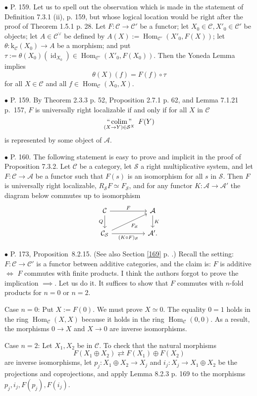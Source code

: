 \documentclass[12pt]{article}
\theoremstyle{remark}
\newcommand{\bu}{\bullet}
\newcommand{\n}{\noindent}
\newcommand{\A}{\mathcal A}
\newcommand{\C}{\mathcal C}
\newcommand{\SSS}{\mathcal S}
\newcommand{\be}{\begin{equation}}
\newcommand{\ee}{\end{equation}}
\newcommand{\pr}{Proposition}
\DeclareMathOperator*{\coli}{colim}
\DeclareMathOperator*{\icolim}{``\coli"}
\DeclareMathOperator{\id}{id}
\DeclareMathOperator{\Hom}{Hom}
\begin{document}
%

\n$\bu$ P. 159. Let us to spell out the observation which is made in the statement of Definition 7.3.1 (ii), p. 159, but whose logical location would be right after the proof of Theorem 1.5.1 p. 28. Let $F:\C\to\C'$ be a functor; let $X_0\in\C,X'_0\in\C'$ be objects; let $A\in\C^\vee$ be defined by $A(X):=\Hom_{\C'}(X'_0,F(X))$; let $\theta:\text{k}_\C(X_0)\to A$ be a morphism; and put $\tau:=\theta(X_0)(\id_{X_0})\in\Hom_{\C'}(X'_0,F(X_0))$. Then the Yoneda Lemma implies 
$$
\theta(X)(f)=F(f)\circ\tau
$$
for all $X\in\C$ and all $f\in\Hom_\C(X_0,X)$. 

% 

\n$\bu$ P. 159. By Theorem 2.3.3 p. 52, Proposition 2.7.1 p. 62, and Lemma 7.1.21 p.~157, $F$ is universally right localizable if and only if for all $X$ in $\C$
$$
\icolim_{(X\to Y)\in\SSS^X}\ F(Y) 
$$
is represented by some object of $\A$. 

%

\n$\bu$ P. 160. The following statement is easy to prove and implicit in the proof of Proposition 7.3.2. Let $\C$ be a category, let $\SSS$ a right multiplicative system, and let $F:\C\to\A$ be a functor such that $F(s)$ is an isomorphism for all $s$ in $\SSS$. Then $F$ is universally right localizable, $R_{\SSS}F\simeq F_{\SSS}$, and for any functor $K:\A\to\A'$ the diagram below commutes up to isomorphism
$$
\begin{tikzcd}
\C\ar{rr}{F}\ar{d}[swap]{Q}&&\A\ar{d}{K}\\
\C_{\SSS}\ar{rr}[swap]{(K\circ F)_{\SSS}}\ar{rru}[swap]{F_{\SSS}}&&\A'.
\end{tikzcd}
$$ 


\n$\bu$ P. 173, \pr\ 8.2.15. (See also Section \ref{169} p. \pageref{169}.) Recall the setting: $F:\C\to\C'$ is a functor between additive categories, and the claim is: $F$ is additive $\iff$ $F$ commutes with finite products. I think the authors forgot to prove the implication $\implies$. Let us do it. It suffices to show that $F$ commutes with $n$-fold products for $n=0$ or $n=2$. 

Case $n=0$: Put $X:=F(0)$. We must prove $X\simeq 0$. The equality $0=1$ holds in the ring $\Hom_\C(X,X)$ because it holds in the ring $\Hom_\C(0,0)$. As a result, the morphisms $0\to X$ and $X\to 0$ are inverse isomorphisms. 

Case $n=2$: Let $X_1,X_2$ be in $\C$. To check that the natural morphisms 
%
\be\label{173} 
F(X_1\oplus X_2)\rightleftarrows F(X_1)\oplus F(X_2)
\ee 
% 
are inverse isomorphisms, let $p_j:X_1\oplus X_2\to X_j$ and $i_j:X_j\to X_1\oplus X_2$ be the projections and coprojections, and apply Lemma 8.2.3 p. 169 to the morphisms $p_j,i_j,F(p_j),F(i_j)$. 
\end{document}
